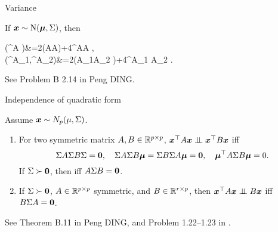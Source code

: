 \documentclass[10pt,a4paper]{book}
\begin{document}
\begin{thmbox}{Variance}
	\begin{proposition}\label{prop:var_MVN_quad}
		If ${\boldsymbol x}\sim\mathrm{N}({\boldsymbol\mu},\Sigma)$, then 
		\begin{sequation*}
			\begin{aligned}
			\Var(\x^\TT A \x)&=2\tr(A\Sigma A\Sigma)+4\bam^\TT A\Sigma A \bam, \\
			\Cov(\x^\TT A_1\x,\x^\TT A_2\x)&=2\tr(A_1\Sigma A_2 \Sigma)+4\bam^\TT A_1 \Sigma A_2 \bam.
			\end{aligned}
		\end{sequation*} 
	\end{proposition}
\end{thmbox}
See Problem B 2.14 in Peng DING. 

\begin{thmbox}{Independence of quadratic form}
	\begin{theorem}\label{thm:MVN_quad_indep}
		Assume ${\boldsymbol x}\sim N_p(\mu,\Sigma)$. 
		\begin{enumerate}
			\item 		For two symmetric matrix $A,B\in\mathbb R^{p\times p}$, $\x^\TT A \x\indep \x^\TT B\x$ iff  
			\begin{equation*}
				\Sigma A\Sigma B\Sigma={\boldsymbol 0},\quad\Sigma A\Sigma B{\boldsymbol\mu}=\Sigma B\Sigma A{\boldsymbol\mu}={\boldsymbol 0},\quad{\boldsymbol\mu}^\top A\Sigma B{\boldsymbol\mu}=0.
			\end{equation*}	
			If $\Sigma\succ {\boldsymbol 0}$, then iff $A\Sigma B={\boldsymbol 0}$.  
			\item If $\Sigma\succ {\boldsymbol 0}$, $A\in\mathbb R^{p\times p}$ symmetric, and $B\in\mathbb R^{r\times p}$, then $\x^\TT A\x \indep B\x$ iff $B\Sigma A={\boldsymbol 0}$.    
		\end{enumerate}
	\end{theorem}
\end{thmbox}
See Theorem B.11 in Peng DING, and Problem 1.22--1.23 in \cite{muirhead1982aspects}.
\end{document}
